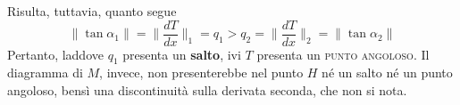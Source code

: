 Risulta, tuttavia, quanto segue
\begin{equation*}
\big\| \tan \alpha_{1} \big\| = \biggl\| \frac{dT}{dx} \biggl\|_{1} = q_{1} > q_{2} = \biggl\| \frac{dT}{dx} \biggl\|_{2} = \big\| \tan \alpha_{2} \big\|
\end{equation*}
Pertanto, laddove $q_{1}$ presenta un \textbf{salto}, ivi $T$ presenta un \textsc{punto angoloso}. Il diagramma di $M$, invece, non presenterebbe nel punto $H$ né un salto né un punto angoloso, bensì una discontinuità sulla derivata seconda, che non si nota.

